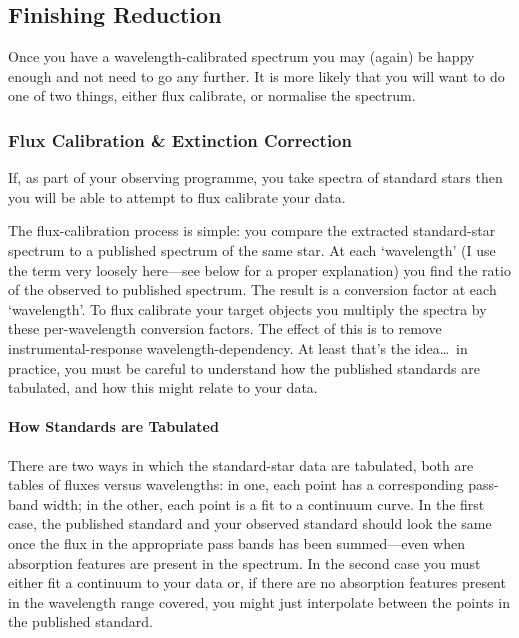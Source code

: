 \documentclass[twoside,11pt]{article}
\newcommand{\htmlref}[2]{#1}
\newcommand{\xlabel}[1]{}
\newcommand{\mlabel}[1]{\xlabel{#1}\label{#1}}
\newcommand{\scspec}[2]{#1}
\newcommand{\scspec}[2]{#2}
\begin{document}
\subsection{\mlabel{finishing}Finishing Reduction}

Once you have a wavelength-calibrated spectrum you may (again)
be happy enough and not need to go any further.
It is more likely that you will want to do one of two things,
either flux calibrate, or normalise the spectrum.


\subsubsection{\mlabel{flux_calibration}Flux Calibration \&
               Extinction Correction}

If, as part of your observing programme, you take spectra of standard stars
then you will be able to attempt to flux calibrate your data.

The flux-calibration process is simple: you compare the extracted
standard-star spectrum to a published spectrum of the same star.  At each
`wavelength' (I use the term very loosely here\scspec{---}{ - }see below for a
proper explanation) you find the ratio of the observed to published spectrum.
The result is a conversion factor at each `wavelength'.
To flux calibrate your target objects you multiply the spectra by these
per-wavelength conversion factors.  The effect of this is to remove
instrumental-response wavelength-dependency.  At least that's the
idea\ldots\ in practice, you must be careful to understand how the
published standards are tabulated, and how this might relate to your data.

\paragraph{How Standards are Tabulated}

There are two ways in which the standard-star data are tabulated,
both are tables of fluxes versus wavelengths:
in one, each point has a corresponding pass-band width;
in the other, each point is a fit to a
\htmlref{continuum}{gl_continuum} curve.
In the first case, the published standard and your observed standard should
look the same once the flux in the appropriate pass bands has been
summed\scspec{---}{ - }even when absorption features are present in the
spectrum.  In the second case you must either fit a continuum to your
data or, if there are no absorption features present in the wavelength range
covered, you might just interpolate between the points in the published
standard.
\end{document}
